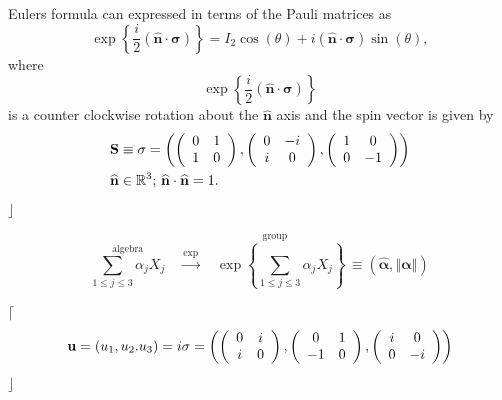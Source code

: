 \documentclass[aps,preprint]{revtex4}%
\begin{document}
Eulers formula can expressed in terms of the Pauli matrices as
\begin{equation}
\exp\left\{  \frac{i}{2}\left(  \widehat{\mathbf{n}}\cdot\mathbf{\sigma
}\right)  \right\}  =I_{2}\cos\left(  \theta\right)  +i\left(
\widehat{\mathbf{n}}\cdot\mathbf{\sigma}\right)  \sin\left(  \theta\right)  ,
\end{equation}
where
\begin{equation}
\exp\left\{  \frac{i}{2}\left(  \widehat{\mathbf{n}}\cdot\mathbf{\sigma
}\right)  \right\}
\end{equation}
is a counter clockwise rotation about the $\widehat{\mathbf{n}}$ axis and the
spin vector is given by
\begin{align}
\mathbf{S}  &  \equiv\mathbf{\sigma}=\left(  \left(
\begin{array}
[c]{cc}%
0 & 1\\
1 & 0
\end{array}
\right)  ,\left(
\begin{array}
[c]{cc}%
0 & -i\\
i & 0
\end{array}
\right)  ,\left(
\begin{array}
[c]{cc}%
1 & 0\\
0 & -1
\end{array}
\right)  \right) \\
\widehat{\mathbf{n}}  &  \in\mathbb{R}^{3};\,\widehat{\mathbf{n}}%
\cdot\widehat{\mathbf{n}}=1.
\end{align}
$\rfloor$%

\begin{equation}
\overset{\text{algebra}}{\sum_{1\leq j\leq3}\alpha_{j}X_{j}}\quad
\overset{\exp}{\longrightarrow}\overset{\text{group}}{\quad\exp\left\{
\sum_{1\leq j\leq3}\alpha_{j}X_{j}\right\}  \,}\equiv\left(
\widehat{\mathbf{\alpha}},\left\Vert \mathbf{\alpha}\right\Vert \right)
\end{equation}


$\lceil$%
\begin{equation}
\mathbf{u}=\left(  u_{1},u_{2}.u_{3}\right)  =i\mathbf{\sigma}=\left(  \left(
%
\begin{array}
[c]{cc}%
0 & i\\
i & 0
\end{array}
\right)  ,\left(
\begin{array}
[c]{cc}%
0 & 1\\
-1 & 0
\end{array}
\right)  ,\left(
\begin{array}
[c]{cc}%
i & 0\\
0 & -i
\end{array}
\right)  \right)
\end{equation}
$\rfloor$%
\end{document}
